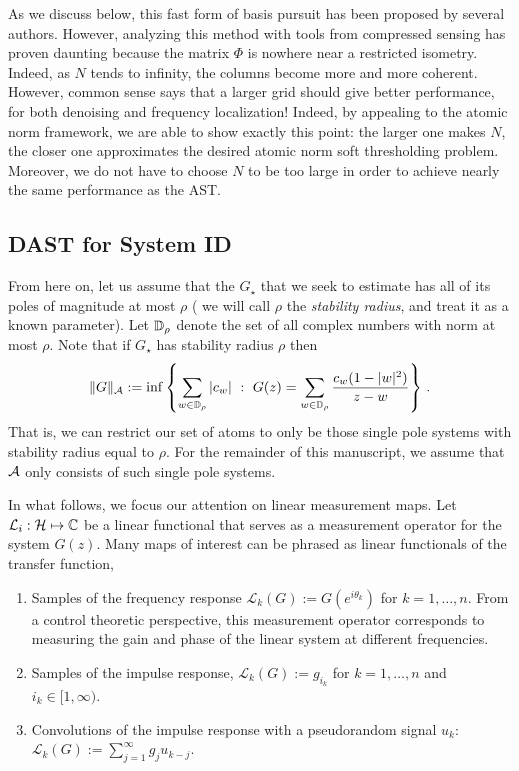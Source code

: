 As we discuss below, this fast form of basis pursuit has been proposed by
several authors. However, analyzing this method with tools from compressed
sensing has proven daunting because the matrix $\Phi$ is nowhere near a
restricted isometry. Indeed, as $N$ tends to infinity, the columns become more
and more coherent. However, common sense says that a larger grid should give
better performance, for both denoising and frequency localization! Indeed, by appealing to the atomic norm framework, we are
able to show exactly this point: the larger one makes $N$, the closer one
approximates the desired atomic norm soft thresholding problem. Moreover, we do
not have to choose $N$ to be too large in order to achieve nearly the same
performance as the AST.

\subsection{DAST for System ID}\label{sec:computation}

From here on, let us assume that the $G_\star$ that we seek to estimate has all of its poles of magnitude at most $\rho$  ( we will call $\rho$ the \emph{stability radius}, and treat it as a known parameter).  Let $\mathbb{D}_\rho$ denote the set of all complex numbers with norm at most $\rho$.  Note that if $G_\star$ has stability radius $\rho$ then
\[
	\|G\|_{\mathcal{A}}:=\inf\left\{ \sum_{w\in \mathbb{D}_\rho} |c_w|~:~G(z) = \sum_{w\in \mathbb{D}_\rho} \frac{c_w (1-|w|^2)}{z-w}\right\}\,.
\]
That is, we can restrict our set of atoms to only be those single pole systems with stability radius equal to $\rho$.  For the remainder of this manuscript, we assume that $\mathcal{A}$ only consists of such single pole systems.

In what follows, we focus our attention on linear measurement maps.  Let $\mathcal{L}_i: \mathcal{H} \mapsto \mathbb{C} $ be a linear functional that serves as a measurement operator for the system $G(z)$.  Many maps of interest can be phrased as linear functionals of the transfer function,
\begin{enumerate}
	\item Samples of the frequency response $\mathcal{L}_k(G):=G(e^{i\theta_k})$ for $k=1,\ldots, n$.  From a control theoretic perspective, this measurement operator corresponds to measuring the gain and phase of the linear system at different frequencies.
	\item Samples of the impulse response, $\mathcal{L}_k(G):=g_{i_k}$ for $k=1,\ldots, n$ and $i_k \in [1,\infty)$.
	\item Convolutions of the impulse response with a pseudorandom signal $u_k$: $\mathcal{L}_k(G):=\sum_{j=1}^{\infty} g_j u_{k-j}$.
\end{enumerate}

